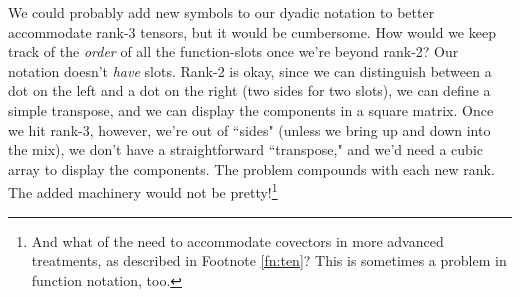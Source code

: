 \documentclass[12pt]{article}
\begin{document}
We could probably add new symbols to our dyadic notation to better accommodate rank-3 tensors, but it would be cumbersome. How would we keep track of the \emph{order} of all the function-slots once we're beyond rank-2? Our notation doesn't \emph{have} slots. Rank-2 is okay, since we can distinguish between a dot on the left and a dot on the right (two sides for two slots), we can define a simple transpose, and we can display the components in a square matrix. Once we hit rank-3, however, we're out of ``sides" (unless we bring up and down into the mix), we don't have a straightforward ``transpose," and we'd need a cubic array to display the components. The problem compounds with each new rank. The added machinery would not be pretty!\footnote{And what of the need to accommodate covectors in more advanced treatments, as described in Footnote \ref{fn:ten}? This is sometimes a problem in function notation, too.}
\end{document}
